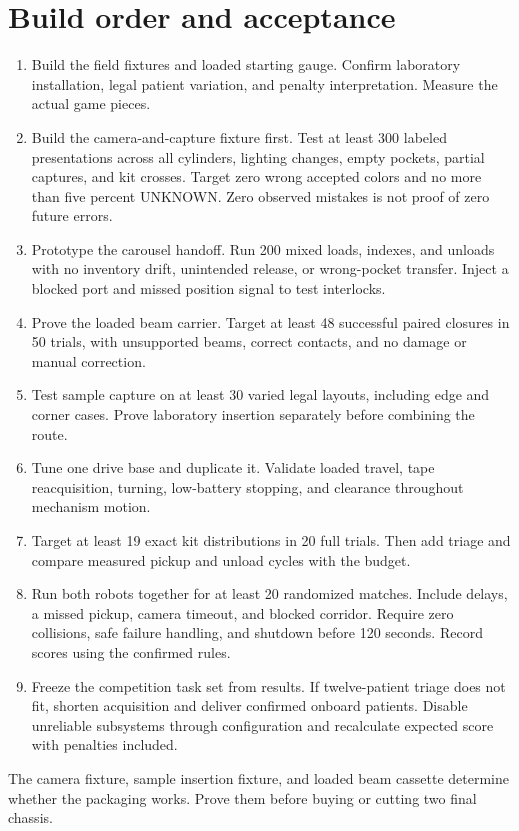 \documentclass[10pt,a4paper]{article}
\begin{document}
\section{Build order and acceptance}
\begin{enumerate}
\item Build the field fixtures and loaded starting gauge. Confirm laboratory installation, legal patient variation, and penalty interpretation. Measure the actual game pieces.
\item Build the camera-and-capture fixture first. Test at least 300 labeled presentations across all cylinders, lighting changes, empty pockets, partial captures, and kit crosses. Target zero wrong accepted colors and no more than five percent UNKNOWN. Zero observed mistakes is not proof of zero future errors.
\item Prototype the carousel handoff. Run 200 mixed loads, indexes, and unloads with no inventory drift, unintended release, or wrong-pocket transfer. Inject a blocked port and missed position signal to test interlocks.
\item Prove the loaded beam carrier. Target at least 48 successful paired closures in 50 trials, with unsupported beams, correct contacts, and no damage or manual correction.
\item Test sample capture on at least 30 varied legal layouts, including edge and corner cases. Prove laboratory insertion separately before combining the route.
\item Tune one drive base and duplicate it. Validate loaded travel, tape reacquisition, turning, low-battery stopping, and clearance throughout mechanism motion.
\item Target at least 19 exact kit distributions in 20 full trials. Then add triage and compare measured pickup and unload cycles with the budget.
\item Run both robots together for at least 20 randomized matches. Include delays, a missed pickup, camera timeout, and blocked corridor. Require zero collisions, safe failure handling, and shutdown before 120 seconds. Record scores using the confirmed rules.
\item Freeze the competition task set from results. If twelve-patient triage does not fit, shorten acquisition and deliver confirmed onboard patients. Disable unreliable subsystems through configuration and recalculate expected score with penalties included.
\end{enumerate}
The camera fixture, sample insertion fixture, and loaded beam cassette determine whether the packaging works. Prove them before buying or cutting two final chassis.
\end{document}
